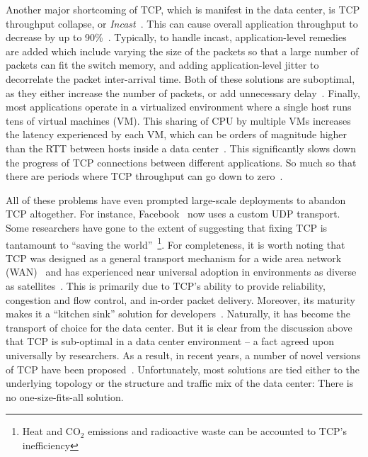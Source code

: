 \documentclass[a4paper,12pt,twoside,openright]{report}
\begin{document}
Another major shortcoming of TCP, which is manifest in the data center, is TCP
throughput collapse, or
\emph{Incast}~\cite{Chen:2009:UTI,Vasudevan:2009:SEF,Wu:2010:IIC,Alizadeh:2010:DCT}.
This can cause overall application throughput to decrease by up to
90\%~\cite{Vasudevan:2009:SEF}. Typically, to handle incast, application-level
remedies are added which include varying the size of the packets so that a large
number of packets can fit the switch memory, and adding application-level jitter
to decorrelate the packet inter-arrival time. Both of these solutions are
suboptimal, as they either increase the number of packets, or add unnecessary
delay~\cite{Alizadeh:2010:DCT}. Finally, most applications operate in a
virtualized environment where a single host runs tens of virtual machines (VM).
This sharing of CPU by multiple VMs increases the latency experienced by each
VM, which can be orders of magnitude higher than the RTT between hosts inside a
data center~\cite{Gamage:2011:OFI,Kangarlou:2010:VIT}. This significantly slows
down the progress of TCP connections between different applications. So much so
that there are periods where TCP throughput can go down to
zero~\cite{Wang:2010:IVN}.

All of these problems have even prompted large-scale deployments to abandon TCP
altogether. For instance, Facebook~\cite{Facebook} now uses a custom UDP
transport. Some researchers have gone to the extent of suggesting that fixing
TCP is tantamount to ``saving the world''~\cite{Lyon:2008:TII}\footnote{Heat and
CO$_{2}$ emissions and radioactive waste can be accounted to TCP's
inefficiency}. For completeness, it is worth noting that TCP was designed as a
general transport mechanism for a wide area network (WAN)~\cite{Clark:1988:DPD}
and has experienced near universal adoption in environments as diverse as
satellites~\cite{Henderson:1999:TPF}. This is primarily due to TCP's ability to
provide reliability, congestion and flow control, and in-order packet delivery.
Moreover, its maturity makes it a ``kitchen sink'' solution for
developers~\cite{Vasudevan:2009:SEF}. Naturally, it has become the transport of
choice for the data center. But it is clear from the discussion above that TCP
is sub-optimal in a data center environment -- a fact agreed upon universally by
researchers. As a result, in recent years, a number of novel versions of TCP
have been
proposed~\cite{Alizadeh:2010:DCT,Wu:2010:IIC,Wilson:2011:BNL,Vasudevan:2009:SEF,Chen:2009:UTI}.
Unfortunately, most solutions are tied either to the underlying topology or the
structure and traffic mix of the data center: There is no one-size-fits-all
solution.
\end{document}
